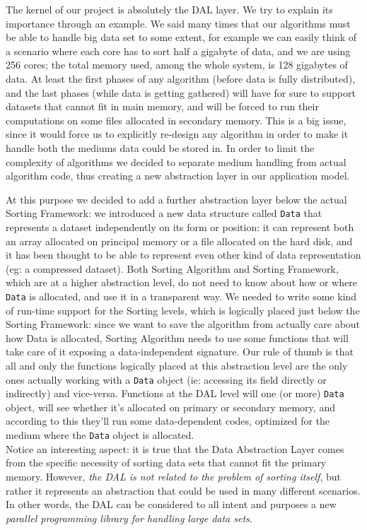 \label{DAL}
The kernel of our project is absolutely the DAL layer. We try to explain its importance through an example. We said many times that our algorithms must be able to handle big data set to some extent, for example we can easily think of a scenario where each core has to sort half a gigabyte of data, and we are using 256 cores; the total memory used, among the whole system, is 128 gigabytes of data.
At least the first phases of any algorithm (before data is fully distributed), and the last phases (while data is getting gathered) will have for sure to support datasets that cannot fit in main memory, and will be forced to run their computations on some files allocated in secondary memory. 
This is a big issue, since it would force us to explicitly re-design any algorithm in order to make it handle both the mediums data could be stored in.
In order to limit the complexity of algorithms we decided to separate medium handling from actual algorithm code, thus creating a new abstraction layer in our application model.

At this purpose we decided to add a further abstraction layer below the actual Sorting Framework: we introduced a new data structure called \texttt{Data} that represents a dataset independently on its form or position: it can represent both an array allocated on principal memory or a file allocated on the hard disk, and it has been thought to be able to represent even other kind of data representation (eg: a compressed dataset). Both Sorting Algorithm and Sorting Framework, which are at a higher abstraction level, do not need to know about how or where \texttt{Data} is allocated, and use it in a transparent way.
We needed to write some kind of run-time support for the Sorting levels, which is logically placed just below the Sorting Framework: since we want to save the algorithm from actually care about how Data is allocated, Sorting Algorithm needs to use some functions that will take care of it exposing a data-independent signature. Our rule of thumb is that all and only the functions logically placed at this abstraction level are the only ones actually working with a \texttt{Data} object (ie: accessing its field directly or indirectly) and vice-versa.
Functions at the DAL level will one (or more) \texttt{Data} object, will see whether it's allocated on primary or secondary memory, and according to this they'll run some data-dependent codes, optimized for the medium where the \texttt{Data} object is allocated. \\

Notice an interesting aspect: it is true that the Data Abstraction Layer comes from the specific necessity of sorting data sets that cannot fit the primary memory. However, \textit{the DAL is not related to the problem of sorting itself}, but rather it represents an abstraction that could be used in many different scenarios. In other words, the DAL can be considered to all intent and purposes a new \textit{parallel programming library for handling large data sets}. 

